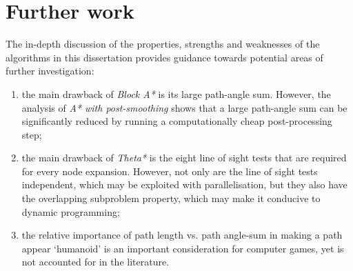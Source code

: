 \documentclass[12pt,notitlepage]{report}
\begin{document}
\section{Further work}
The in-depth discussion of the properties, strengths and weaknesses of the algorithms in this dissertation provides guidance towards potential areas of further investigation:
\begin{enumerate}
\item the main drawback of {\em Block A*} is its large path-angle sum. However, the analysis of {\em A* with post-smoothing} shows that a large path-angle sum can be significantly reduced by running a computationally cheap post-processing step;
\item the main drawback of {\em Theta*} is the eight line of sight tests that are required for every node expansion. However, not only are the line of sight tests independent, which may be exploited with parallelisation, but they also have the overlapping subproblem property, which may make it conducive to dynamic programming;
\item the relative importance of path length vs. path angle-sum in making a path appear `humanoid' is an important consideration for computer games, yet is not accounted for in the literature.
\end{enumerate} 

{}



\end{document}

